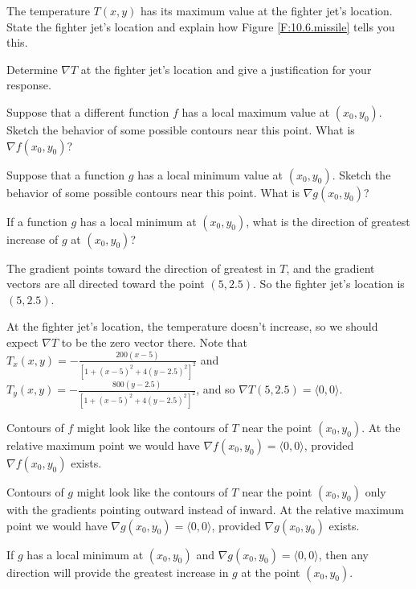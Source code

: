 \begin{activity} \label{A:10.6.13} 
  \ba
\item The temperature $T(x,y)$ has its maximum value at the fighter
  jet's location.  State the fighter jet's location and explain
  how Figure \ref{F:10.6.missile} tells you this.
\item Determine $\nabla T$ at the fighter jet's location and give a
  justification for your response.
\item Suppose that a different function $f$ has a local maximum value at
  $(x_0,y_0)$.  Sketch the behavior of some possible contours near this point. 
  What is $\nabla f(x_0,y_0)$?
\item Suppose that a function $g$ has a local minimum value at
  $(x_0,y_0)$.  Sketch the behavior of some possible contours near this point.
  What is $\nabla g(x_0,y_0)$?
\item If a function $g$ has a local minimum at  $(x_0,y_0)$, what is the direction of greatest increase of $g$ at $(x_0,y_0)$?
  \ea

\end{activity}

\begin{activitySolution}
\ba 
\item The gradient points toward the direction of greatest in $T$, and the gradient vectors are all directed toward the point $(5,2.5)$. So the fighter jet's location is $(5,2.5)$. 

\item At the fighter jet's location, the temperature doesn't increase, so we should expect $\nabla T$ to be the zero vector there. Note that $T_x(x,y) = -\frac{200(x-5)}{[1+(x-5)^2+4(y-2.5)^2]^2}$ and $T_y(x,y) =  -\frac{800(y-2.5)}{[1+(x-5)^2+4(y-2.5)^2]^2}$, and so $\nabla T(5,2.5) = \langle 0, 0 \rangle$. 

\item Contours of $f$ might look like the contours of $T$ near the point $(x_0,y_0)$. At the relative maximum point we would have $\nabla f(x_0,y_0) = \langle 0,0\rangle$, provided $\nabla f(x_0,y_0)$ exists.

\item Contours of $g$ might look like the contours of $T$ near the point $(x_0,y_0)$ only with the gradients pointing outward instead of inward. At the relative maximum point we would have $\nabla g(x_0,y_0) = \langle 0,0\rangle$, provided $\nabla g(x_0,y_0)$ exists.

\item If $g$ has a local minimum at $(x_0,y_0)$ and $\nabla g(x_0,y_0) = \langle 0,0 \rangle$, then any direction will provide the greatest increase in $g$ at the point $(x_0,y_0)$.  
\ea

\end{activitySolution}

\aftera
